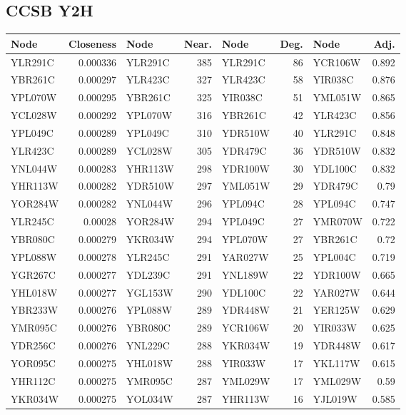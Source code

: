 \subsection*{CCSB Y2H}
\begin{adjustwidth}{-1.2in}{-1.2in}\begin{center}
\begin{tabular}{lrlrlrlr}
\hline
 Node    &   Closeness & Node    &   Near. & Node    &   Deg. & Node    &   Adj. \\
\hline
 YLR291C &    0.000336 & YLR291C &     385 & YLR291C &     86 & YCR106W &  0.892 \\
 YBR261C &    0.000297 & YLR423C &     327 & YLR423C &     58 & YIR038C &  0.876 \\
 YPL070W &    0.000295 & YBR261C &     325 & YIR038C &     51 & YML051W &  0.865 \\
 YCL028W &    0.000292 & YPL070W &     316 & YBR261C &     42 & YLR423C &  0.856 \\
 YPL049C &    0.000289 & YPL049C &     310 & YDR510W &     40 & YLR291C &  0.848 \\
 YLR423C &    0.000289 & YCL028W &     305 & YDR479C &     36 & YDR510W &  0.832 \\
 YNL044W &    0.000283 & YHR113W &     298 & YDR100W &     30 & YDL100C &  0.832 \\
 YHR113W &    0.000282 & YDR510W &     297 & YML051W &     29 & YDR479C &  0.79  \\
 YOR284W &    0.000282 & YNL044W &     296 & YPL094C &     28 & YPL094C &  0.747 \\
 YLR245C &    0.00028  & YOR284W &     294 & YPL049C &     27 & YMR070W &  0.722 \\
 YBR080C &    0.000279 & YKR034W &     294 & YPL070W &     27 & YBR261C &  0.72  \\
 YPL088W &    0.000278 & YLR245C &     291 & YAR027W &     25 & YPL004C &  0.719 \\
 YGR267C &    0.000277 & YDL239C &     291 & YNL189W &     22 & YDR100W &  0.665 \\
 YHL018W &    0.000277 & YGL153W &     290 & YDL100C &     22 & YAR027W &  0.644 \\
 YBR233W &    0.000276 & YPL088W &     289 & YDR448W &     21 & YER125W &  0.629 \\
 YMR095C &    0.000276 & YBR080C &     289 & YCR106W &     20 & YIR033W &  0.625 \\
 YDR256C &    0.000276 & YNL229C &     288 & YKR034W &     19 & YDR448W &  0.617 \\
 YOR095C &    0.000275 & YHL018W &     288 & YIR033W &     17 & YKL117W &  0.615 \\
 YHR112C &    0.000275 & YMR095C &     287 & YML029W &     17 & YML029W &  0.59  \\
 YKR034W &    0.000275 & YOL034W &     287 & YHR113W &     16 & YJL019W &  0.585 \\
\hline
\end{tabular}
\end{center}\end{adjustwidth}